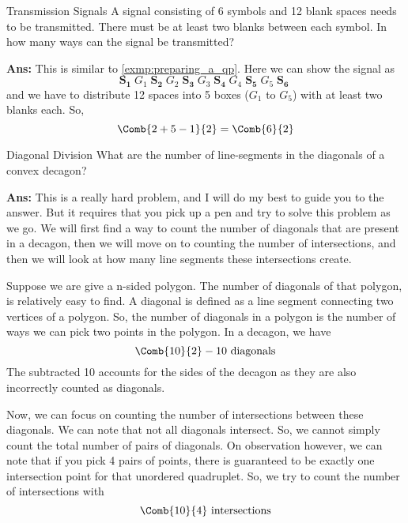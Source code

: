 \begin{exampletcb}
    {Transmission Signals}{}
    A signal consisting of 6 symbols and 12 blank spaces needs to be transmitted. There must be at least two blanks between each symbol. In how many ways can the signal be transmitted?

    \textbf{Ans:} This is similar to \cref{exmp:preparing_a_qp}. Here we can show the signal as
    \[
        \mathbf{S_1}\; G_1 \;\mathbf{S_2}\;G_2\;\mathbf{S_3}\;G_3\;\mathbf{S_4}\;G_4\;\mathbf{S_5}\;G_5\;\mathbf{S_6}\;
    \]
    and we have to distribute 12 spaces into 5 boxes (\mbox{$G_1$} to \mbox{$G_5$}) with at least two blanks each. So,
    \[
        \Comb{2+5-1}{2} = \Comb{6}{2}
    \]
\end{exampletcb}


\begin{exampletcb}
    {Diagonal Division}{}
    What are the number of line-segments in the diagonals of a convex decagon?

    \textbf{Ans:} This is a really hard problem, and I will do my best to guide you to the answer. But it requires that you pick up a pen and try to solve this problem as we go. We will first find a way to count the number of diagonals that are present in a decagon, then we will move on to counting the number of intersections, and then we will look at how many line segments these intersections create.

    Suppose we are give a n-sided polygon. The number of diagonals of that polygon, is relatively easy to find. A diagonal is defined as a line segment connecting two vertices of a polygon. So, the number of diagonals in a polygon is the number of ways we can pick two points in the polygon. In a decagon, we have
    \[
        \Comb{10}{2} - 10 \text{ diagonals}
    \]
    The subtracted 10 accounts for the sides of the decagon as they are also incorrectly counted as diagonals.

    Now, we can focus on counting the number of intersections between these diagonals. We can note that not all diagonals intersect. So, we cannot simply count the total number of pairs of diagonals. On observation however, we can note that if you pick 4 pairs of points, there is guaranteed to be exactly one intersection point for that unordered quadruplet. So, we try to count the number of intersections with
    \[
        \Comb{10}{4} \text{ intersections}
    \]


\end{exampletcb}
